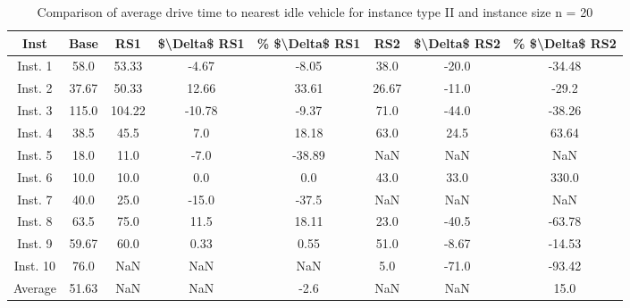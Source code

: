 \begin{table}[H]
\centering
\begin{tabular}{cccccccc}
  \hline
  \textbf{Inst} & \textbf{Base} & \textbf{RS1} & \textbf{\$\textbackslash{}Delta\$  RS1} & \textbf{\% \$\textbackslash{}Delta\$  RS1} & \textbf{RS2} & \textbf{\$\textbackslash{}Delta\$  RS2} & \textbf{\% \$\textbackslash{}Delta\$  RS2} \\\hline
  Inst. 1 & 58.0 & 53.33 & -4.67 & -8.05 & 38.0 & -20.0 & -34.48 \\
  Inst. 2 & 37.67 & 50.33 & 12.66 & 33.61 & 26.67 & -11.0 & -29.2 \\
  Inst. 3 & 115.0 & 104.22 & -10.78 & -9.37 & 71.0 & -44.0 & -38.26 \\
  Inst. 4 & 38.5 & 45.5 & 7.0 & 18.18 & 63.0 & 24.5 & 63.64 \\
  Inst. 5 & 18.0 & 11.0 & -7.0 & -38.89 & NaN & NaN & NaN \\
  Inst. 6 & 10.0 & 10.0 & 0.0 & 0.0 & 43.0 & 33.0 & 330.0 \\
  Inst. 7 & 40.0 & 25.0 & -15.0 & -37.5 & NaN & NaN & NaN \\
  Inst. 8 & 63.5 & 75.0 & 11.5 & 18.11 & 23.0 & -40.5 & -63.78 \\
  Inst. 9 & 59.67 & 60.0 & 0.33 & 0.55 & 51.0 & -8.67 & -14.53 \\
  Inst. 10 & 76.0 & NaN & NaN & NaN & 5.0 & -71.0 & -93.42 \\
  Average & 51.63 & NaN & NaN & -2.6 & NaN & NaN & 15.0 \\\hline
\end{tabular}
\caption{Comparison of average drive time to nearest idle vehicle for instance type II and instance size n = 20}
\label{tab:wait:resrelocation-nearest-drive-time-comparison_II_20}
\end{table}
